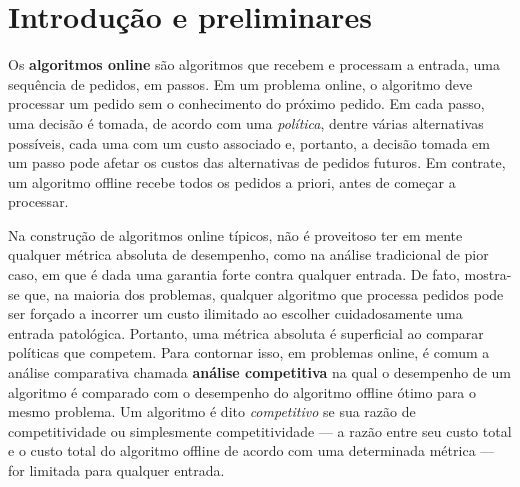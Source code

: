 \chapter{Introdução e preliminares} 




Os \textbf{algoritmos online} são algoritmos que recebem e processam a entrada, uma sequência de pedidos, em passos. Em um problema online, o algoritmo deve processar um pedido sem o conhecimento do próximo pedido. Em cada passo, uma decisão é tomada, de acordo com uma \emph{política}, dentre várias alternativas possíveis, cada uma com um custo associado e, portanto, a decisão tomada em um passo pode afetar os custos das alternativas de pedidos futuros. Em contrate, um algoritmo offline recebe todos os pedidos a priori, antes de começar a processar. 

Na construção de algoritmos online típicos, não é proveitoso ter em mente qualquer métrica absoluta de desempenho, como na análise tradicional de pior caso, em que é dada uma garantia forte contra qualquer entrada. De fato, mostra-se que, na maioria dos problemas, qualquer algoritmo que processa pedidos pode ser forçado a incorrer um custo ilimitado ao escolher cuidadosamente uma entrada patológica. Portanto, uma métrica absoluta é superficial ao comparar políticas que competem. Para contornar isso, em problemas online, é comum a análise comparativa chamada \textbf{análise competitiva} na qual o desempenho de um algoritmo é comparado com o desempenho do algoritmo offline ótimo para o mesmo problema. Um algoritmo é dito \emph{competitivo} se sua razão de competitividade ou simplesmente competitividade — a razão entre seu custo total e o custo total do algoritmo offline de acordo com uma determinada métrica — for limitada para qualquer entrada.


